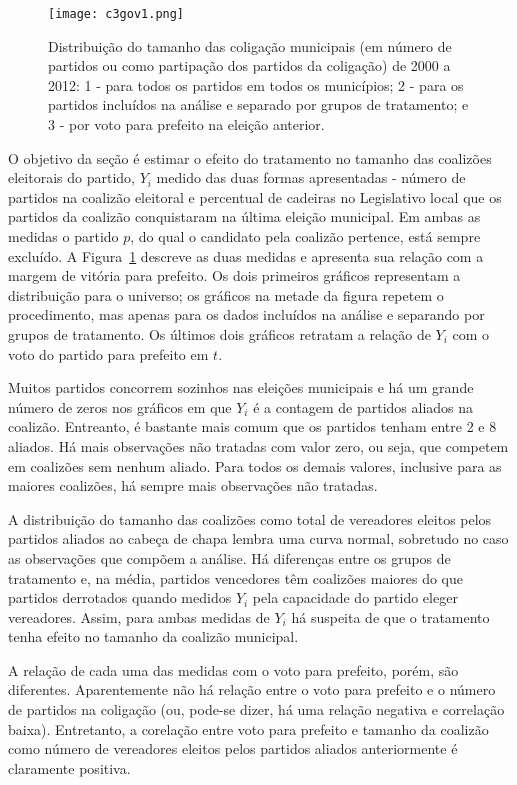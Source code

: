 \begin{figure}[htp]
	\centering
	\texttt{[image: c3gov1.png]}
	\caption{Distribuição do tamanho das coligação municipais (em número de partidos ou como partipação dos partidos da coligação) de 2000 a 2012: 1 - para todos os partidos em todos os municípios; 2 - para os partidos incluídos na análise e separado por grupos de tratamento; e 3 - por voto para prefeito na eleição anterior.}
	\label{fig:c3gov1}
\end{figure}

O objetivo da seção é estimar o efeito do tratamento no tamanho das coalizões eleitorais do partido, $Y_{i}$ medido das duas formas apresentadas - número de partidos na coalizão eleitoral e percentual de cadeiras no Legislativo local que os partidos da coalizão conquistaram na última eleição municipal. Em ambas as medidas o partido $p$, do qual o candidato pela coalizão pertence, está sempre excluído. A Figura~\ref{fig:c3gov1} descreve as duas medidas e apresenta sua relação com a margem de vitória para prefeito. Os dois primeiros gráficos representam a distribuição para o universo; os gráficos na metade da figura repetem o procedimento, mas apenas para os dados incluídos na análise e separando por grupos de tratamento. Os últimos dois gráficos retratam a relação de $Y_{i}$ com o voto do partido para prefeito em $t$.

Muitos partidos concorrem sozinhos nas eleições municipais e há um grande número de zeros nos gráficos em que $Y_{i}$ é a contagem de partidos aliados na coalizão. Entreanto, é bastante mais comum que os partidos tenham entre 2 e 8 aliados. Há mais observações não tratadas com valor zero, ou seja, que competem em coalizões sem nenhum aliado. Para todos os demais valores, inclusive para as maiores coalizões, há sempre mais observações não tratadas.

A distribuição do tamanho das coalizões como total de vereadores eleitos pelos partidos aliados ao cabeça de chapa lembra uma curva normal, sobretudo no caso as observações que compõem a análise. Há diferenças entre os grupos de tratamento e, na média, partidos vencedores têm coalizões maiores do que partidos derrotados quando medidos $Y_{i}$ pela capacidade do partido eleger vereadores. Assim, para ambas medidas de $Y_{i}$ há suspeita de que o tratamento tenha efeito no tamanho da coalizão municipal.

A relação de cada uma das medidas com o voto para prefeito, porém, são diferentes. Aparentemente não há relação entre o voto para prefeito e o número de partidos na coligação (ou, pode-se dizer, há uma relação negativa e correlação baixa). Entretanto, a corelação entre voto para prefeito e tamanho da coalizão como número de vereadores eleitos pelos partidos aliados anteriormente é claramente positiva.

